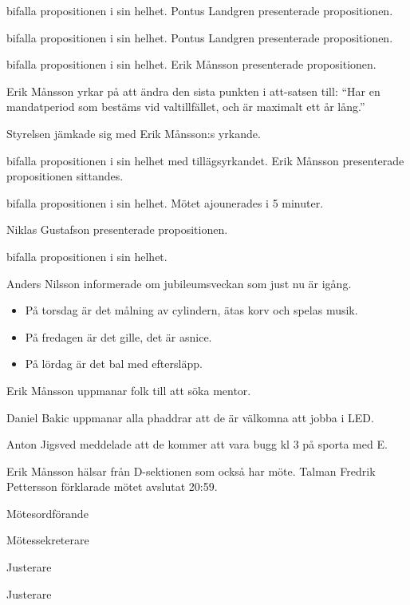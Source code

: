 \documentclass[10pt]{article}
\def\mo{Fredrik Pettersson}
\def\ms{Johan Karlberg}
\def\ji{David Uhler Brand}
\def\jii{Malin Lindström}
\begin{document}
\begin{paragrafer}
\begin{paragrafer}
            \Mba bifalla propositionen i sin helhet.
            Pontus Landgren presenterade propositionen.

            \Mba bifalla propositionen i sin helhet.
            Pontus Landgren presenterade propositionen.

            \Mba bifalla propositionen i sin helhet.
            Erik Månsson presenterade propositionen.

            Erik Månsson yrkar på att ändra den sista punkten i att-satsen till:
            ``Har en mandatperiod som bestäms vid valtillfället, och är maximalt ett år lång.''

            Styrelsen jämkade sig med Erik Månsson:s yrkande.

            \Mba bifalla propositionen i sin helhet med tillägsyrkandet.
            Erik Månsson presenterade propositionen sittandes.

            \Mba bifalla propositionen i sin helhet.
            Mötet ajounerades i 5 minuter.

            Niklas Gustafson presenterade propositionen.

            \Mba bifalla propositionen i sin helhet.
        \end{paragrafer}

Anders Nilsson informerade om jubileumsveckan som just nu är igång.
\begin{itemize}
  \item På torsdag är det målning av cylindern, ätas korv och spelas musik.
  \item På fredagen är det gille, det är asnice.
  \item På lördag är det bal med eftersläpp.
\end{itemize}

Erik Månsson uppmanar folk till att söka mentor.

Daniel Bakic uppmanar alla phaddrar att de är välkomna att jobba i LED.

Anton Jigsved meddelade att de kommer att vara bugg kl 3 på sporta med E.

Erik Månsson hälsar från D-sektionen som också har möte.
Talman {\mo} förklarade mötet avslutat 20:59.

\end{paragrafer}

\hidesignfoot
\begin{signatures}{4}
\signature{\mo}{Mötesordförande}
\signature{\ms}{Mötessekreterare}
\signature{\ji}{Justerare}
\signature{\jii}{Justerare}
\end{signatures}
\end{document}
